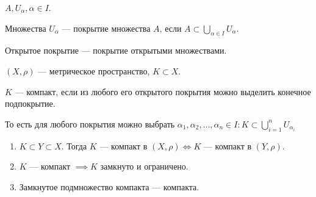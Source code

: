 \begin{definition}
    $A, U_\alpha, \alpha \in I$.

    Множества  $U_\alpha$ --- покрытие множества  $A$, если  $A \subset \bigcup\limits_{\alpha \in I} U_\alpha$.
\end{definition}
\begin{definition}
    Открытое покрытие --- покрытие открытыми множествами.
\end{definition}
\begin{definition}
    $(X, \rho)$ --- метрическое пространство, $K \subset X$.

    $K$ --- компакт, если из любого его открытого покрытия можно выделить конечное подпокрытие. 
\end{definition}
\begin{definition}
    То есть для любого покрытия можно выбрать $\alpha_1, \alpha_2, \ldots, \alpha_n \in I\!: K \subset\bigcup \limits_{i=1}^n U_{\alpha_i}$
\end{definition}
\begin{theorem}
    \begin{enumerate}
        \item $K \subset Y \subset X$. Тогда  $K$ --- компакт в  $(X, \rho) \iff K$ --- компакт в  $(Y, \rho)$.
        \item  $K$ --- компакт  $\implies K$ замкнуто и ограничено.
        \item  Замкнутое подмножество компакта --- компакта.
    \end{enumerate}
\end{theorem}
